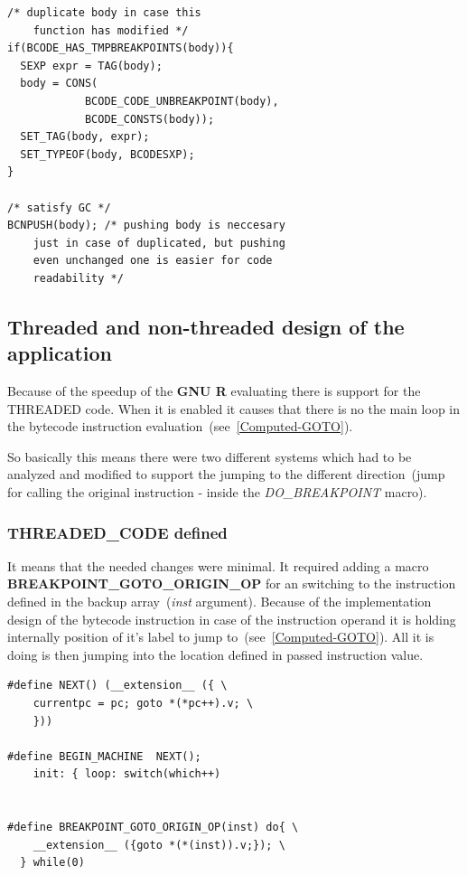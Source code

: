\documentclass[thesis=M,english]{FITthesis}[2018/10/20]
\begin{document}
\begin{lstlisting}
/* duplicate body in case this 
	function has modified */
if(BCODE_HAS_TMPBREAKPOINTS(body)){
  SEXP expr = TAG(body);
  body = CONS(
            BCODE_CODE_UNBREAKPOINT(body), 
            BCODE_CONSTS(body));
  SET_TAG(body, expr);
  SET_TYPEOF(body, BCODESXP);
}

/* satisfy GC */
BCNPUSH(body); /* pushing body is neccesary 
	just in case of duplicated, but pushing 
	even unchanged one is easier for code
    readability */

\end{lstlisting}

\subsection{Threaded and non-threaded design of the application}

Because of the speedup of the \textbf{GNU R} evaluating there is support for the THREADED code. When it is enabled it causes that there is no the main loop in the bytecode instruction evaluation~(see~\ref{Computed-GOTO}). 

So basically this means there were two different systems which had to be analyzed and modified to support the jumping to the different direction~(jump for calling the original instruction - inside the \textit{DO{\_}BREAKPOINT} macro).

\subsubsection{THREADED{\_}CODE defined}
It means that the needed changes were minimal. It required adding a macro \textbf{BREAKPOINT{\_}GOTO{\_}ORIGIN{\_}OP} for an switching to the instruction defined in the backup array~(\textit{inst} argument). Because of the implementation design of the bytecode instruction in case of the instruction operand it is holding internally position of it's label to jump to~(see~\ref{Computed-GOTO}). All it is doing is then jumping into the location defined in passed instruction value.

\begin{lstlisting}
#define NEXT() (__extension__ ({ \
    currentpc = pc; goto *(*pc++).v; \
    }))

#define BEGIN_MACHINE  NEXT(); 
    init: { loop: switch(which++)


#define BREAKPOINT_GOTO_ORIGIN_OP(inst) do{ \
    __extension__ ({goto *(*(inst)).v;}); \
  } while(0)
\end{lstlisting}
\end{document}
